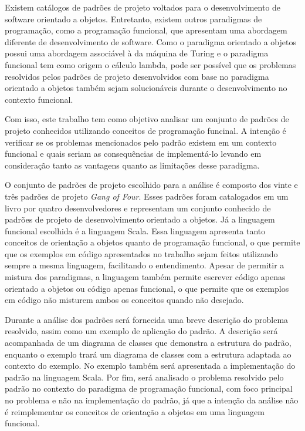 
Existem catálogos de padrões de projeto 
voltados para o desenvolvimento de software 
orientado a objetos. Entretanto, existem 
outros paradigmas de programação, como 
a programação funcional, que apresentam 
uma abordagem diferente de desenvolvimento 
de software.
Como o paradigma orientado a objetos possui uma 
abordagem associável à da máquina de Turing e 
o paradigma funcional tem como origem o cálculo 
lambda, pode ser possível que os problemas 
resolvidos pelos padrões de projeto desenvolvidos 
com base no paradigma orientado a objetos também 
sejam solucionáveis durante o desenvolvimento 
no contexto funcional. 


Com isso, este trabalho tem como objetivo 
analisar um conjunto de padrões de projeto 
conhecidos utilizando conceitos de programação 
funcinal. A intenção é verificar se os 
problemas mencionados pelo padrão existem 
em um contexto funcional e quais 
seriam as consequências de implementá-lo 
levando em consideração tanto as vantagens 
quanto as limitações desse paradigma.


O conjunto de padrões de projeto escolhido 
para a análise é composto dos vinte e três 
padrões de projeto \textit{Gang of Four}. 
Esses padrões foram catalogados em um livro 
por quatro desenvolvedores e representam 
um conjunto conhecido de padrões de projeto 
de desenvolvimento orientado a objetos. 
Já a linguagem funcional escolhida é a 
linguagem Scala. Essa linguagem 
apresenta tanto conceitos de orientação 
a objetos quanto de programação funcional, 
o que permite que os exemplos em código 
apresentados no trabalho sejam feitos 
utilizando sempre a mesma linguagem, 
facilitando o entendimento. 
Apesar de permitir a mistura dos 
paradigmas, a linguagem também permite  
escrever código apenas orientado a 
objetos ou código apenas funcional, 
o que permite que os exemplos em 
código não misturem ambos os conceitos 
quando não desejado.


Durante a análise dos padrões será 
fornecida uma breve descrição do problema 
resolvido, assim como um exemplo de aplicação 
do padrão. A descrição será acompanhada de 
um diagrama de classes que demonstra a 
estrutura do padrão, enquanto o exemplo 
trará um diagrama de classes com a estrutura 
adaptada ao contexto do exemplo. No exemplo 
também será apresentada a implementação 
do padrão na linguagem Scala. Por fim, será 
analisado o problema resolvido pelo padrão 
no contexto do paradigma de programação 
funcional, com foco principal no problema 
e não na implementação do padrão, já que 
a intenção da análise não é reimplementar os 
conceitos de orientação a objetos em uma 
linguagem funcional. 

